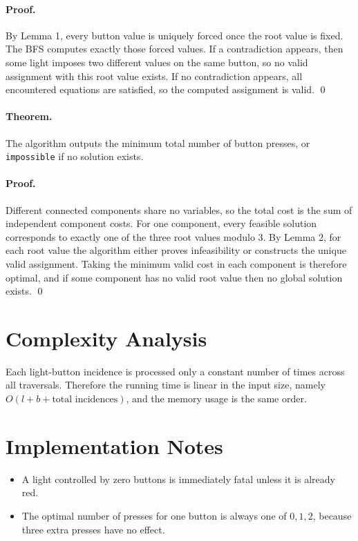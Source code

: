 \documentclass[11pt]{article}
\begin{document}
\paragraph{Proof.}
By Lemma 1, every button value is uniquely forced once the root value is fixed. The BFS computes exactly
those forced values. If a contradiction appears, then some light imposes two different values on the same
button, so no valid assignment with this root value exists. If no contradiction appears, all encountered
equations are satisfied, so the computed assignment is valid. \qed

\paragraph{Theorem.}
The algorithm outputs the minimum total number of button presses, or \texttt{impossible} if no solution
exists.

\paragraph{Proof.}
Different connected components share no variables, so the total cost is the sum of independent component
costs. For one component, every feasible solution corresponds to exactly one of the three root values
modulo $3$. By Lemma 2, for each root value the algorithm either proves infeasibility or constructs the
unique valid assignment. Taking the minimum valid cost in each component is therefore optimal, and if
some component has no valid root value then no global solution exists. \qed

\section*{Complexity Analysis}

Each light-button incidence is processed only a constant number of times across all traversals. Therefore
the running time is linear in the input size, namely $O(l+b+\text{total incidences})$, and the memory
usage is the same order.

\section*{Implementation Notes}

\begin{itemize}[leftmargin=*]
    \item A light controlled by zero buttons is immediately fatal unless it is already red.
    \item The optimal number of presses for one button is always one of $0,1,2$, because three extra
    presses have no effect.
\end{itemize}
\end{document}
